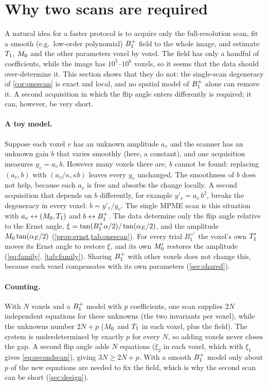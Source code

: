 \section{Why two scans are required}\label{sec:twoscans}

A natural idea for a faster protocol is to acquire only the full-resolution scan, fit a smooth
(e.g.\ low-order polynomial) $B_1^{+}$ field to the whole image, and estimate $T_1$, $M_0$ and the other
parameters voxel by voxel. The field has only a handful of coefficients, while the image has
$10^5$--$10^6$ voxels, so it seems that the data should over-determine it. This section shows that
they do not: the single-scan degeneracy of \cref{cor:onescan} is exact and local, and no
spatial model of $B_1^{+}$ alone can remove it. A second acquisition in which the flip angle enters
differently is required; it can, however, be very short.

\paragraph{A toy model.} Suppose each voxel $v$ has an unknown amplitude $a_v$ and the scanner has an
unknown gain $b$ that varies smoothly (here, a constant), and one acquisition measures
$y_v=a_v\,b$. However many voxels there are, $b$ cannot be found: replacing $(a_v,b)$ with
$(a_v/\kappa,\kappa b)$ leaves every $y_v$ unchanged. The smoothness of $b$ does not help, because each
$a_v$ is free and absorbs the change locally. A second acquisition that depends on $b$
differently, for example $y'_v=a_v\,b^2$, breaks the degeneracy in every voxel: $b=y'_v/y_v$. The
single MPME scan is this situation with $a_v\leftrightarrow(M_0,T_1)$ and $b\leftrightarrow B_1^{+}$. The data
determine only the flip angle relative to the Ernst angle, $\xi=\tan(B_1^{+}\alpha/2)/\tan(\alpha_E/2)$, and the
amplitude $M_0\tan(\alpha_E/2)$ (\cref{prop:ernst,tab:onescan}). For every trial $B_1^{+\prime}$ the voxel's own
$T_1'$ moves its Ernst angle to restore $\xi$, and its own $M_0'$ restores the amplitude
(\eqref{eq:family}, \cref{tab:family}). Sharing $B_1^{+}$ with other voxels does not change this, because
each voxel compensates with its own parameters (\cref{sec:shared}).

\paragraph{Counting.} With $N$ voxels and a $B_1^{+}$ model with $p$ coefficients, one scan supplies
$2N$ independent equations for these unknowns (the two invariants per voxel), while the unknowns
number $2N+p$ ($M_0$ and $T_1$ in each voxel, plus the field). The system is underdetermined by
exactly $p$ for every $N$, so adding voxels never closes the gap. A second flip angle adds $N$
equations ($\xi_2$ in each voxel, which with $\xi_1$ gives \eqref{eq:secondscan}), giving $3N\ge2N+p$. With a smooth $B_1^{+}$
model only about $p$ of the new equations are needed to fix the field, which is why the second
scan can be short (\cref{sec:design}).

